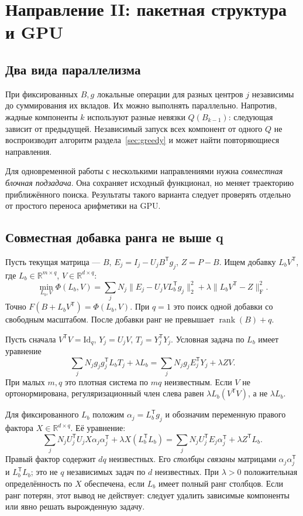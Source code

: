 \documentclass[11pt,a4paper]{article}
\numberwithin{equation}{section}
\theoremstyle{remark}
\newcommand{\R}{\mathbb R}
\newcommand{\Id}{\mathrm{Id}}
\newcommand{\T}{^{\mathsf T}}
\newcommand{\F}{_{\mathrm F}}
\DeclareMathOperator{\rank}{rank}
\begin{document}
\section{Направление II: пакетная структура и GPU}\label{sec:gpu}

\subsection{Два вида параллелизма}
При фиксированных $B,g$ локальные операции для разных центров $j$
независимы до суммирования их вкладов. Их можно выполнять параллельно.
Напротив, жадные компоненты $k$ используют разные невязки
$Q(B_{k-1})$: следующая зависит от предыдущей.
Независимый запуск всех компонент от одного $Q$ не воспроизводит алгоритм
раздела~\ref{sec:greedy} и может найти повторяющиеся направления.

Для одновременной работы с несколькими направлениями нужна
\emph{совместная блочная подзадача}. Она сохраняет исходный функционал,
но меняет траекторию приближённого поиска. Результаты такого варианта
следует проверять отдельно от простого переноса арифметики на GPU.

\subsection{Совместная добавка ранга не выше q}\label{sec:block}
Пусть текущая матрица --- $B$, $E_j=I_j-U_jB\T g_j$, $Z=P-B$.
Ищем добавку $L_bV\T$, где
$L_b\in\R^{m\times q}$, $V\in\R^{d\times q}$:
\begin{equation}\label{eq:blockobj}
 \min_{L_b,V}\Phi(L_b,V)
 =\sum_jN_j\|E_j-U_jV L_b\T g_j\|_2^2
   +\lambda\|L_bV\T-Z\|\F^2.
\end{equation}
Точно $F(B+L_bV\T)=\Phi(L_b,V)$.
При $q=1$ это поиск одной добавки со свободным масштабом.
После добавки ранг не превышает $\rank(B)+q$.

Пусть сначала $V\T V=\Id_q$, $Y_j=U_jV$, $T_j=Y_j\T Y_j$.
Условная задача по $L_b$ имеет уравнение
\begin{equation}\label{eq:blockleft}
 \sum_jN_jg_jg_j\T L_bT_j+\lambda L_b
 =\sum_jN_jg_jE_j\T Y_j+\lambda ZV.
\end{equation}
При малых $m,q$ это плотная система по $mq$ неизвестным.
Если $V$ не ортонормирована, регуляризационный член слева равен
$\lambda L_b(V\T V)$, а не $\lambda L_b$.

Для фиксированного $L_b$ положим $\alpha_j=L_b\T g_j$ и обозначим
переменную правого фактора $X\in\R^{d\times q}$. Её уравнение:
\begin{equation}\label{eq:blockright}
 \sum_jN_jU_j\T U_jX\alpha_j\alpha_j\T
 +\lambda X(L_b\T L_b)
 =\sum_jN_jU_j\T E_j\alpha_j\T+\lambda Z\T L_b.
\end{equation}
Правый фактор содержит $dq$ неизвестных. Его \emph{столбцы связаны}
матрицами $\alpha_j\alpha_j\T$ и $L_b\T L_b$; это не $q$ независимых задач
по $d$ неизвестных.
При $\lambda>0$ положительная определённость по $X$ обеспечена, если
$L_b$ имеет полный ранг столбцов. Если ранг потерян, этот вывод не действует:
следует удалить зависимые компоненты или явно решать вырожденную задачу.
\end{document}
